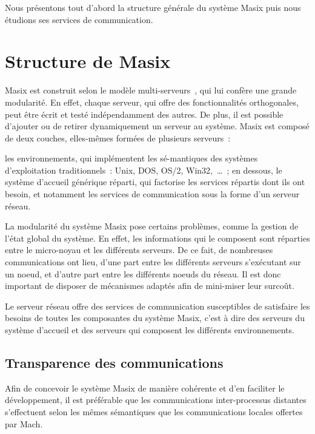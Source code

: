 Nous pr\'esentons tout d'abord la structure g\'en\'erale du syst\`eme Masix
puis nous \'etudions ses services de communication.

\section{Structure de Masix}
Masix est construit selon le mod\`ele multi-serveurs~\cite{mach-us95}, 
qui lui conf\`ere une 
grande modularit\'e. En effet, chaque serveur, qui offre des fonctionnalit\'es 
orthogonales, peut \^etre \'ecrit et test\'e ind\'ependamment des autres.
De plus, il est possible d'ajouter ou de retirer dynamiquement un serveur 
au syst\`eme.
Masix est compos\'e de deux couches, elles-m\^emes form\'ees de plusieurs 
serveurs~:
\begin{itemize}
\myitem les environnements, qui impl\'ementent les s\'e-mantiques des 
syst\`emes d'exploitation traditionnels~: Unix, DOS, OS/2, Win32,~\dots~;
\myitem en dessous, le syst\`eme d'accueil g\'en\'erique r\'eparti, 
qui factorise les 
services r\'epartis dont ils ont besoin, et notamment les 
services de communication sous la forme d'un serveur r\'eseau.
\end{itemize}

La modularit\'e du syst\`eme Masix pose certains probl\`emes,
comme la gestion de l'\'etat global du syst\`eme. En effet,
les informations qui le composent sont r\'eparties entre le micro-noyau
et les diff\'erents serveurs. De ce fait, de nombreuses communications ont
lieu, d'une part entre les diff\'erents serveurs s'ex\'ecutant sur un noeud, 
et d'autre part
entre les diff\'erents noeuds du r\'eseau. Il est donc important
de disposer de m\'ecanismes adapt\'es afin de mini-miser leur surco\^ut.

Le serveur r\'eseau offre des services de communication susceptibles
de satisfaire les besoins de toutes les composantes du syst\`eme Masix, 
c'est \`a dire des serveurs du syst\`eme d'accueil et 
des serveurs qui composent les diff\'erents environnements.

\subsection {Transparence des communications}

Afin de concevoir le syst\`eme Masix de mani\`ere coh\'erente et d'en 
faciliter le d\'eveloppement, il est pr\'ef\'erable que les 
communications inter-processus distantes s'effectuent selon
les m\^emes s\'emantiques que les communications locales offertes par
Mach.

